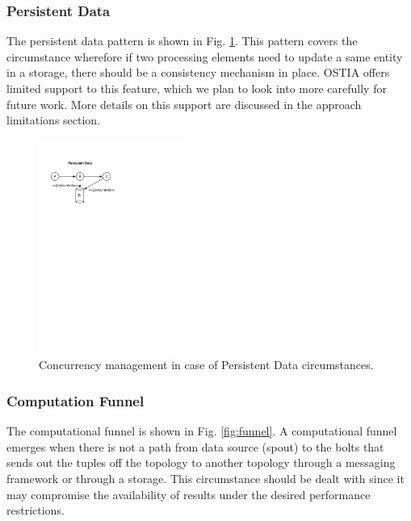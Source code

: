
\subsubsection{Persistent Data}

The persistent data pattern is shown in Fig. \ref{fig:persistence}. This pattern covers the circumstance wherefore if two processing elements need to update a same entity in a storage, there should be a consistency mechanism in place. OSTIA offers limited support to this feature, which we plan to look into more carefully for future work. More details on this support are discussed in the approach limitations section.

\begin{figure}
	\begin{center}
		\includegraphics[width=5cm]{images/persistence}
		\caption{Concurrency management in case of Persistent Data circumstances.}
		\label{fig:persistence}
	\end{center}
\end{figure}


\subsubsection{Computation Funnel}
The computational funnel is shown in Fig. \ref{fig:funnel}. A computational funnel emerges when there is not a path from data source (spout) to the bolts that sends out the tuples off the topology to another topology through a messaging framework or through a storage. This circumstance should be dealt with since it may compromise the availability of results under the desired performance restrictions.

